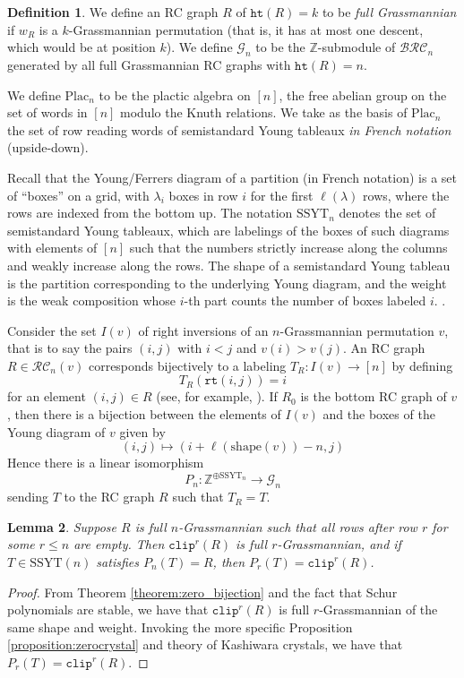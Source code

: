 \documentclass[a4paper,fleqn]{cas-sc}
\newtheorem{lemma}{Lemma}[subsection]
\theoremstyle{definition}
\newtheorem{definition}[lemma]{Definition}
\theoremstyle{remark}
\numberwithin{equation}{subsection}
\newcommand{\wof}[1]{w_{#1}}
\newcommand{\grass}{\mathcal{G}}
\newcommand{\plac}{\mathrm{Plac}}
\newcommand{\rtt}{\mathtt{rt}}
\newcommand{\hr}{\mathtt{ht}}
\newcommand{\clp}{\mathtt{clip}}
\newcommand{\BRC}{\mathcal{BRC}}
\newcommand{\RC}{\mathcal{RC}}
\newcommand{\SSYT}{\mathrm{SSYT}}
\begin{document}
\begin{definition}
We define an RC graph $R$ of $\hr(R)=k$ to be \emph{full Grassmannian} if $\wof{R}$ is a $k$-Grassmannian permutation (that is, it has at most one descent, which would be at position $k$). We define $\grass_n$ to be the $\mathbb{Z}$-submodule of $\BRC_n$ generated by all full Grassmannian RC graphs with $\hr(R)= n$.

We define $\plac_n$ to be the plactic algebra on $[n]$, the free abelian group on the set of words in $[n]$ modulo the Knuth relations. We take as the basis of $\plac_n$ the set of row reading words of semistandard Young tableaux \emph{in French notation} (upside-down).

Recall that the Young/Ferrers diagram of a partition (in French notation) is a set of ``boxes'' on a grid, with $\lambda_i$ boxes in row $i$ for the first $\ell(\lambda)$ rows, where the rows are indexed from the bottom up. The notation $\mathrm{SSYT}_n$ denotes the set of semistandard Young tableaux, which are labelings of the boxes of such diagrams with elements of $[n]$ such that the numbers strictly increase along the columns and weakly increase along the rows. The shape of a semistandard Young tableau is the partition corresponding to the underlying Young diagram, and the weight is the weak composition whose $i$-th part counts the number of boxes labeled $i$. .

Consider the set $I(v)$ of right inversions of an $n$-Grassmannian permutation $v$, that is to say the pairs $(i,j)$ with $i<j$ and $v(i)>v(j)$. An RC graph $R\in\RC_n(v)$ corresponds bijectively to a labeling $T_R:I(v)\to [n]$ by defining
$$T_R(\rtt(i,j)) = i$$
for an element $(i,j)\in R$ (see, for example, \cite{axelrodfreed2025inversionstableaux}). If $R_0$ is the bottom RC graph of $v$, then there is a bijection between the elements of $I(v)$ and the boxes of the Young diagram of $v$ given by
$$(i,j) \mapsto (i + \ell(\mathrm{shape}(v)) - n, j)$$
Hence there is a linear isomorphism
$$P_n:\mathbb{Z}^{\oplus\mathrm{SSYT}_n}\to \grass_n$$
sending $T$ to the RC graph $R$ such that $T_R = T$.
\end{definition}

\begin{lemma}
Suppose $R$ is full $n$-Grassmannian such that all rows after row $r$ for some $r\leq n$ are empty. Then $\clp^r(R)$ is full $r$-Grassmannian, and if $T\in \SSYT(n)$ satisfies $P_n(T)=R$, then $P_r(T)=\clp^r(R)$.
\end{lemma}
\begin{proof}
From Theorem \ref{theorem:zero_bijection} and the fact that Schur polynomials are stable, we have that $\clp^r(R)$ is full $r$-Grassmannian of the same shape and weight. Invoking the more specific Proposition \ref{proposition:zerocrystal} and theory of Kashiwara crystals, we have that $P_r(T)=\clp^r(R)$.
\end{proof}
\end{document}
